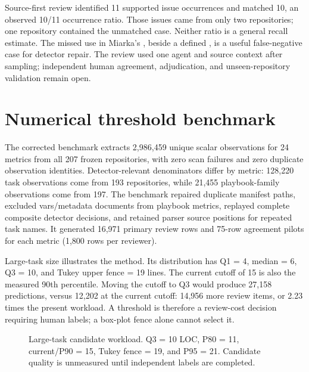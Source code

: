 Source-first review identified 11 supported issue occurrences and matched 10,
an observed 10/11 occurrence ratio. Those issues came from only two
repositories; one repository contained the unmatched case. Neither ratio is a
general recall estimate. The missed  use in Miarka's
, beside a defined
, is a useful false-negative case for detector repair.
The review used one agent and source context after sampling; independent
human agreement, adjudication, and unseen-repository validation remain open.

\section{Numerical threshold benchmark}
The corrected benchmark extracts 2,986,459 unique scalar observations for 24
metrics from all 207 frozen repositories, with zero scan failures and zero
duplicate observation identities. Detector-relevant denominators differ by
metric: 128,220 task observations come from 193 repositories, while 21,455
playbook-family observations come from 197. The benchmark repaired duplicate
manifest paths, excluded vars/metadata documents from playbook metrics,
replayed complete composite detector decisions, and retained parser source
positions for repeated task names. It generated 16,971 primary review rows
and 75-row agreement pilots for each metric (1,800 rows per reviewer).

Large-task size illustrates the method. Its distribution has Q1 = 4,
median = 6, Q3 = 10, and Tukey upper fence = 19 lines. The current cutoff of
15 is also the measured 90th percentile. Moving the cutoff to Q3 would
produce 27,158 predictions, versus 12,202 at the current cutoff: 14,956 more
review items, or 2.23 times the present workload. A threshold is therefore a
review-cost decision requiring human labels; a box-plot fence alone cannot
select it.

\begin{figure}[htbp]
\centering
{}
\caption{Large-task candidate workload. Q3 = 10 LOC, P80 = 11,
current/P90 = 15, Tukey fence = 19, and P95 = 21. Candidate quality is
unmeasured until independent labels are completed.}
\label{fig:v007_threshold_sensitivity}
\end{figure}

